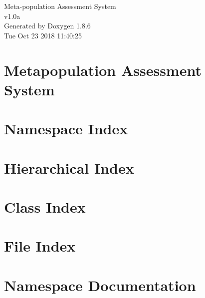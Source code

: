 \documentclass[twoside]{book}
\newcommand{\clearemptydoublepage}{%
  \newpage{\pagestyle{empty}\cleardoublepage}%
}
\begin{document}
\hypersetup{pageanchor=false}
\begin{titlepage}
\vspace*{7cm}
\begin{center}%
{\Large Meta-\/population Assessment System \\[1ex]\large v1.\-0a }\\
\vspace*{1cm}
{\large Generated by Doxygen 1.8.6}\\
\vspace*{0.5cm}
{\small Tue Oct 23 2018 11:40:25}\\
\end{center}
\end{titlepage}
\clearemptydoublepage
\tableofcontents
\clearemptydoublepage
{}
\hypersetup{pageanchor=true}

\chapter{Metapopulation Assessment System}
\label{md__home_oppy__net_beans_projects_mas__r_e_a_d_m_e}
\hypertarget{md__home_oppy__net_beans_projects_mas__r_e_a_d_m_e}{}

\chapter{Namespace Index}

\chapter{Hierarchical Index}

\chapter{Class Index}

\chapter{File Index}

\chapter{Namespace Documentation}

\end{document}
